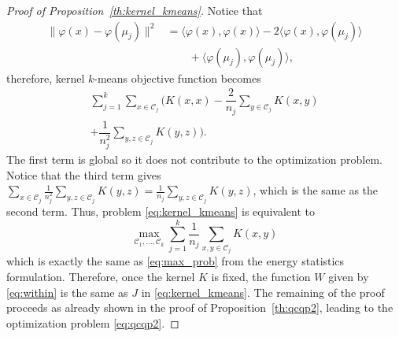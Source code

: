 \documentclass{article}
\newcommand\kk{K}
\newcommand\C{{\mathcal{C}}}
\begin{document}
\begin{proof}[Proof of Proposition~\ref{th:kernel_kmeans}]
Notice that 
\begin{equation}
\begin{split}
\| \varphi(x) - \varphi(\mu_j) \|^2 &= \langle 
\varphi(x),  \varphi(x) \rangle
- 2 \langle \varphi(x), \varphi(\mu_j)\rangle \\
& \qquad + \langle \varphi(\mu_j), \varphi(\mu_j) \rangle,
\end{split}
\end{equation}
therefore, kernel $k$-means objective function becomes
\begin{equation}
\label{eq:J}
\begin{split}
\sum_{j=1}^k \sum_{x\in\C_j} \bigg(
\kk(x,x) - 
\dfrac{2}{n_j} \sum_{y\in \C_j} \kk(x,y) \\
+ \dfrac{1}{n_j^2}
\sum_{y,z \in \C_j} \kk(y,z) \bigg).
\end{split}
\end{equation}
The first term is global so it does not contribute to the optimization
problem. Notice that the third term gives
$\sum_{x\in\C_j} \tfrac{1}{n_j^2} \sum_{y,z\in\C_j} \kk(y,z) =
\tfrac{1}{n_j}\sum_{y,z\in\C_j} \kk(y,z)$, which is the same as
the second term. Thus, problem
\eqref{eq:kernel_kmeans} is equivalent to
\begin{equation}
\max_{\C_1,\dotsc,\C_k}
\sum_{j=1}^k \dfrac{1}{n_j} \sum_{x,y \in\C_j} \kk(x,y) 
\end{equation}
which is exactly the same as 
\eqref{eq:max_prob} from the energy statistics formulation. Therefore,
once the kernel $\kk$ is fixed, the function 
$W$ given by \eqref{eq:within} is the same
as $J$ in \eqref{eq:kernel_kmeans}.
The remaining of the proof proceeds as 
already shown in the proof of Proposition~\ref{th:qcqp2}, leading to
the optimization problem \eqref{eq:qcqp2}.
\end{proof}
\end{document}
